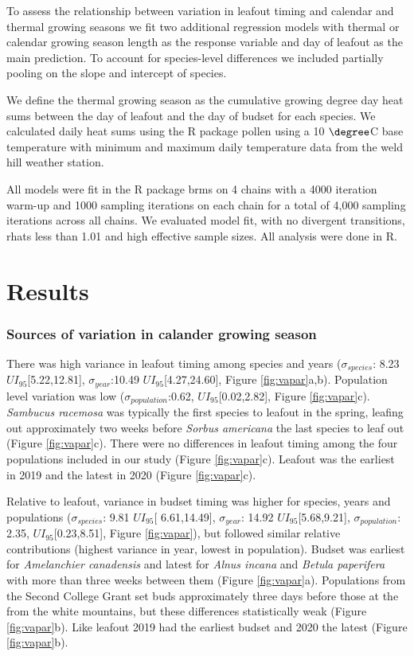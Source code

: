 \documentclass[12 pt]{article}
\begin{document}
To assess the relationship between variation in leafout timing and calendar and thermal growing seasons we fit two additional regression models with thermal or calendar growing season length as the response variable and day of leafout as the main prediction. To account for species-level differences we included partially pooling on the slope and intercept of species.

We define the thermal growing season as the cumulative growing degree day heat sums between the day of leafout and the day of budset for each species. We calculated daily heat sums using the R package pollen \citep{} using a 10 $\degree$C base temperature with minimum and maximum daily temperature data from the weld hill weather station.

All models were fit in the R package brms on 4 chains with a 4000 iteration warm-up and 1000 sampling iterations on each chain for a total of 4,000 sampling iterations across all chains. We evaluated model fit, with no divergent transitions, rhats less than 1.01 and high effective sample sizes. All analysis were done in R.

\section{Results}
\subsubsection{Sources of variation in calander growing season}
There was high variance in leafout timing among species and years ($\sigma_{species}$: 8.23 $UI_{95}$[5.22,12.81], $\sigma_{year}$:10.49 $UI_{95}$[4.27,24.60], Figure \ref{fig:vapar}a,b). Population level variation was low ($\sigma_{population}$:0.62, $UI_{95}$[0.02,2.82], Figure \ref{fig:vapar}c). \emph{Sambucus racemosa} was typically the first species to leafout in the spring, leafing out approximately two weeks before \emph{Sorbus americana} the last species to leaf out (Figure \ref{fig:vapar}c). There were no differences in leafout timing among the four populations included in our study (Figure \ref{fig:vapar}c). Leafout was the earliest in 2019 and the latest in 2020 (Figure \ref{fig:vapar}c). 

Relative to leafout, variance in budset timing was higher for species, years and populations ($\sigma_{species}$: 9.81 $UI_{95}$[ 6.61,14.49], $\sigma_{year}$: 14.92 $UI_{95}$[5.68,9.21], $\sigma_{population}$: 2.35, $UI_{95}$[0.23,8.51], Figure \ref{fig:vapar}), but followed similar relative contributions (highest variance in year, lowest in population).
Budset was earliest for \emph{Amelanchier canadensis} and latest for \emph{Alnus incana} and \emph{Betula paperifera} with more than three weeks between them (Figure \ref{fig:vapar}a). Populations from the Second College Grant set buds approximately three days before those at the from the white mountains, but these differences statistically weak (Figure \ref{fig:vapar}b). Like leafout 2019 had the earliest budset and 2020 the latest (Figure \ref{fig:vapar}b).
\end{document}
